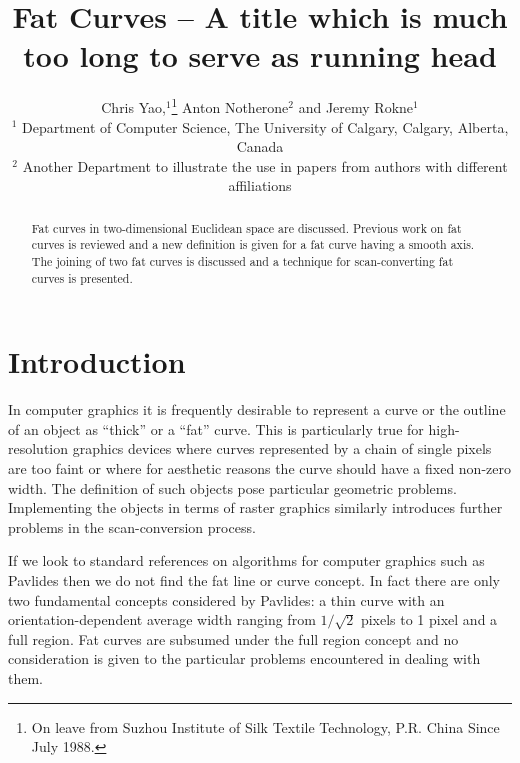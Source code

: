 \documentclass{egpubl}
\title[Fat Curves]{Fat Curves -- A title which is much too long to
                   serve as running head}
\author[Yao et al]
       {Chris Yao,$^1$\thanks{On leave from Suzhou Institute of Silk Textile Technology,
        P.R. China Since July 1988.}
        Anton Notherone$^2$ and
        Jeremy Rokne$^1$
        \\
        $^1$ Department of Computer Science, The University of Calgary, Calgary,
             Alberta, Canada\\
        $^2$ Another Department to illustrate the use in papers from authors
             with different affiliations
       }
\begin{document}
\maketitle

\begin{abstract}
Fat curves in two-dimensional Euclidean space are discussed. Previous
work on fat curves is reviewed and a new definition is given for a fat
curve having a smooth axis. The joining of two fat curves is discussed
and a technique for scan-converting fat curves is presented.

\begin{classification} %
\end{classification}

\end{abstract}

\section{Introduction}

In computer graphics it is frequently desirable to represent a curve or
the outline of an object as ``thick'' or a ``fat'' curve. This is
particularly true for high-resolution graphics devices where curves
represented by a chain of single pixels are too faint or where for
aesthetic reasons the curve should have a fixed non-zero width. The
definition of such objects pose particular geometric problems.
Implementing the objects in terms of raster graphics similarly
introduces further problems in the scan-conversion process.

If we look to standard references on algorithms for computer graphics
such as Pavlides\cite{yll} then we do not find the fat line or curve concept.
In fact there are only two fundamental concepts considered by
Pavlides\cite{yll}: a thin curve with an orientation-dependent average width
ranging from $1/\sqrt{2}$ pixels to 1 pixel and a full region. Fat
curves are subsumed under the full region concept and no consideration
is given to the particular problems encountered in dealing with them.
\end{document}
